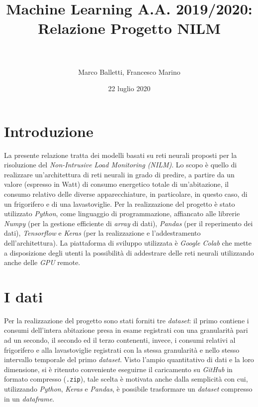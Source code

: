 \documentclass[12pt,a4paper,fleqn]{article}
\date{22 luglio 2020}
\author{\\\\\large Marco Balletti, Francesco Marino}
\title{Machine Learning A.A. 2019/2020:\\Relazione Progetto NILM}
\begin{document}
\maketitle

\section{Introduzione}
La presente relazione tratta dei modelli basati su reti neurali proposti per la risoluzione del \textsl{Non-Intrusive Load Monitoring (NILM)}. Lo scopo è quello di realizzare un'architettura di reti neurali in grado di predire, a partire da un valore (espresso in Watt) di consumo energetico totale di un'abitazione, il consumo relativo delle diverse apparecchiature, in particolare, in questo caso, di un frigorifero e di una lavastoviglie. Per la realizzazione del progetto è stato utilizzato \textsl{Python}, come linguaggio di programmazione, affiancato alle librerie \textsl{Numpy} (per la gestione efficiente di \textsl{array} di dati), \textsl{Pandas} (per il reperimento dei dati), \textsl{Tensorflow} e \textsl{Keras} (per la realizzazione e l'addestramento dell'architettura). La piattaforma di sviluppo utilizzata è \textsl{Google Colab} che mette a disposizione degli utenti la possibilità di addestrare delle reti neurali utilizzando anche delle \textsl{GPU} remote.

\section{I dati}
Per la realizzazione del progetto sono stati forniti tre  \textsl{dataset}: il primo contiene i consumi dell'intera abitazione presa in esame registrati con una granularità pari ad un secondo, il secondo ed il terzo contenenti, invece, i consumi relativi al frigorifero e alla lavastoviglie registrati con la stessa granularità e nello stesso intervallo temporale del primo \textsl{dataset}. 
Visto l'ampio quantitativo di dati e la loro dimensione, si è ritenuto conveniente eseguirne il caricamento su \textsl{GitHub} in formato compresso (\texttt{.zip}), tale scelta è motivata anche dalla semplicità con cui, utilizzando \textsl{Python}, \textsl{Keras} e \textsl{Pandas}, è possibile trasformare un \textsl{dataset} compresso in un \textsl{dataframe}.
\end{document}
